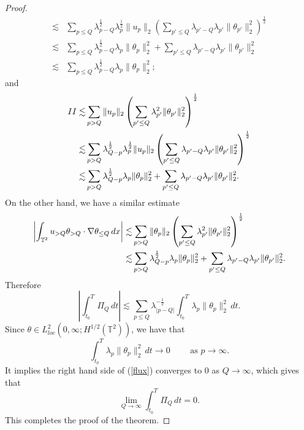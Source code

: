 \documentclass{amsart}
\numberwithin{Theorem}{section}
\theoremstyle{definition}
\theoremstyle{remark}
\begin{document}
\begin{proof}
\begin{equation}
\begin{split}
\lesssim &\sum_{p\leq Q}\lambda_{p-Q}^{\frac 12}\lambda_p^{\frac 12}\|u_p\|_2\left(\sum_{p'\leq Q}\lambda_{p'-Q}\lambda_{p'}\|\theta_{p'}\|_2^2\right)^{\frac 12}\\
\lesssim &\sum_{p\leq Q}\lambda_{p-Q}^{\frac 12}\lambda_p\|\theta_p\|_2^2
+\sum_{p'\leq Q}\lambda_{p'-Q}\lambda_{p'}\|\theta_{p'}\|_2^2\\
\lesssim &\sum_{p\leq Q}\lambda_{p-Q}^{\frac 12}\lambda_p\|\theta_p\|_2^2;
\end{split}
\end{equation}
and
\begin{equation}\notag
\begin{split}
II\lesssim &\sum_{p> Q}\|u_p\|_2\left(\sum_{p'\leq Q}\lambda^2_{p'}\|\theta_{p'}\|_2^2\right)^{\frac 12}\\
\lesssim &\sum_{p> Q}\lambda_{Q-p}^{\frac 12}\lambda_p^{\frac 12}\|u_p\|_2\left(\sum_{p'\leq Q}\lambda_{p'-Q}\lambda_{p'}\|\theta_{p'}\|_2^2\right)^{\frac 12}\\
\lesssim &\sum_{p> Q}\lambda_{Q-p}^{\frac 12}\lambda_p\|\theta_p\|_2^2
+\sum_{p'\leq Q}\lambda_{p'-Q}\lambda_{p'}\|\theta_{p'}\|_2^2.
\end{split}
\end{equation}
On the other hand, we have a similar estimate
\begin{equation}\notag
\begin{split}
\left|\int_{\mathbb T^2}u_{>Q}\theta_{>Q}\cdot\nabla\theta_{\leq Q}\,dx\right|
\lesssim &\sum_{p>Q}\|\theta_p\|_2\left(\sum_{p'\leq Q}\lambda_{p'}^2\|\theta_{p'}\|_2^2\right)^{\frac 12}\\
\lesssim &\sum_{p> Q}\lambda_{Q-p}^{\frac 12}\lambda_p\|\theta_p\|_2^2
+\sum_{p'\leq Q}\lambda_{p'-Q}\lambda_{p'}\|\theta_{p'}\|_2^2.
\end{split}
\end{equation}
Therefore 
\begin{equation}\label{flux}
\left|\int_{t_0}^{T}\Pi_Q\,dt\right|\lesssim \sum_{p\leq Q}\lambda^{-\frac 12}_{|p-Q|}\int_{t_0}^{T}\lambda_p\|\theta_p\|_2^2\,dt.
\end{equation}
Since $\theta\in L_{loc}^2(0,\infty;H^{1/2}(\mathbb T^2))$, we have that
\[\int_{t_0}^{T}\lambda_p\|\theta_p\|_2^2\,dt\to 0 \qquad \mbox { as } p\to\infty.\]
It implies the right hand side of (\ref{flux}) converges to 0 as $Q\to\infty$, which gives that 
\[
\lim_{Q\to \infty}\int_{t_0}^{T} \Pi_Q \,dt=0.
\]
This completes the proof of the theorem. 
\end{proof}
\end{document}
